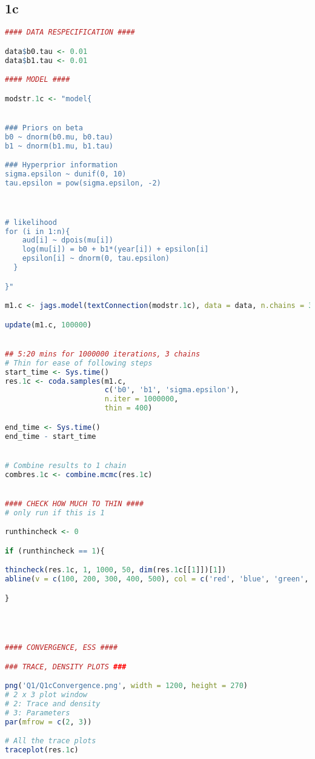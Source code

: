 \documentclass[11pt]{article}
\begin{document}
\subsection{1c} \label{appA1c}
\begin{lstlisting}[language=R]
#### DATA RESPECIFICATION ####

data$b0.tau <- 0.01
data$b1.tau <- 0.01

#### MODEL ####

modstr.1c <- "model{


### Priors on beta
b0 ~ dnorm(b0.mu, b0.tau)
b1 ~ dnorm(b1.mu, b1.tau)

### Hyperprior information
sigma.epsilon ~ dunif(0, 10)
tau.epsilon = pow(sigma.epsilon, -2)



# likelihood
for (i in 1:n){
    aud[i] ~ dpois(mu[i])
    log(mu[i]) = b0 + b1*(year[i]) + epsilon[i]
    epsilon[i] ~ dnorm(0, tau.epsilon)
  }

}"

m1.c <- jags.model(textConnection(modstr.1c), data = data, n.chains = 3)

update(m1.c, 100000)


## 5:20 mins for 1000000 iterations, 3 chains
# Thin for ease of following steps
start_time <- Sys.time()
res.1c <- coda.samples(m1.c, 
                       c('b0', 'b1', 'sigma.epsilon'), 
                       n.iter = 1000000,
                       thin = 400)

end_time <- Sys.time()
end_time - start_time


# Combine results to 1 chain
combres.1c <- combine.mcmc(res.1c)


#### CHECK HOW MUCH TO THIN ####
# only run if this is 1

runthincheck <- 0

if (runthincheck == 1){

thincheck(res.1c, 1, 1000, 50, dim(res.1c[[1]])[1])
abline(v = c(100, 200, 300, 400, 500), col = c('red', 'blue', 'green', 'purple', 'pink'))

} 




#### CONVERGENCE, ESS ####

### TRACE, DENSITY PLOTS ###

png('Q1/Q1cConvergence.png', width = 1200, height = 270)
# 2 x 3 plot window
# 2: Trace and density
# 3: Parameters
par(mfrow = c(2, 3))

# All the trace plots
traceplot(res.1c)


\end{lstlisting}
\end{document}
